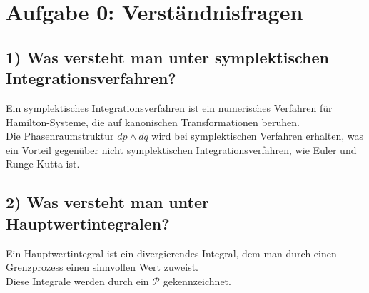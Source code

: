 \setcounter{secnumdepth}{0}
\section{Aufgabe 0: Verständnisfragen}
\label{sec:auf0}

\subsection{1) Was versteht man unter symplektischen Integrationsverfahren?}

Ein symplektisches Integrationsverfahren ist ein numerisches Verfahren für Hamilton-Systeme, die auf kanonischen Transformationen beruhen.\\
Die Phasenraumstruktur $dp \wedge dq$ wird bei symplektischen Verfahren erhalten, was ein Vorteil gegenüber nicht symplektischen Integrationsverfahren, wie Euler und Runge-Kutta ist.

\subsection{2) Was versteht man unter Hauptwertintegralen?}

Ein Hauptwertintegral ist ein divergierendes Integral, dem man durch einen Grenzprozess einen sinnvollen Wert zuweist.\\
Diese Integrale werden durch ein $\mathcal{P}$ gekennzeichnet.